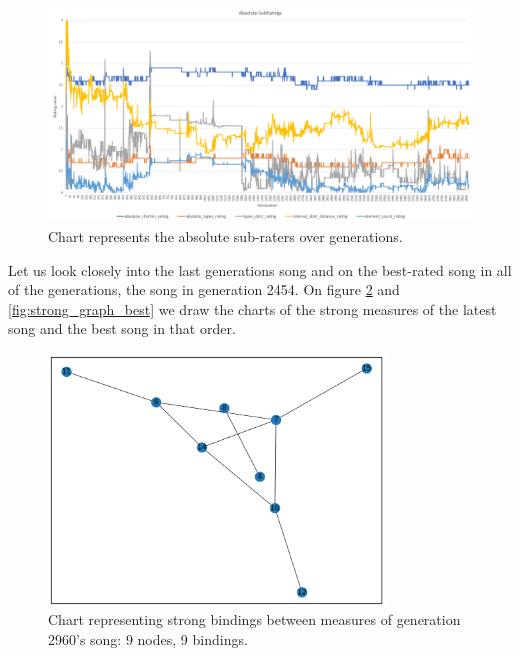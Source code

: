 \documentclass[a4paper]{article}
\begin{document}
\begin{figure}[H]
	\advance\leftskip-1.5cm
	\includegraphics[width=1.2\textwidth]{Fotos/results/gf/absolute_rating_graph.png}
	\caption{Chart represents the absolute sub-raters over generations.}
	\label{fig:gf_absolute}
\end{figure}


Let us look closely into the last generations song and on the best-rated song in all of the generations, the song in generation 2454. On figure \ref{fig:strong_graph_last} and \ref{fig:strong_graph_best} we draw the charts of the strong measures of the latest song and the best song in that order.


\begin{figure}[H]
	\begin{center}
	\includegraphics[width=0.8\textwidth]{Fotos/results/gf/strong_graph_last.png}
\end{center}
	\caption{Chart representing strong bindings between measures of generation 2960's song: 9 nodes, 9 bindings.}
	\label{fig:strong_graph_last}
\end{figure}
\end{document}
